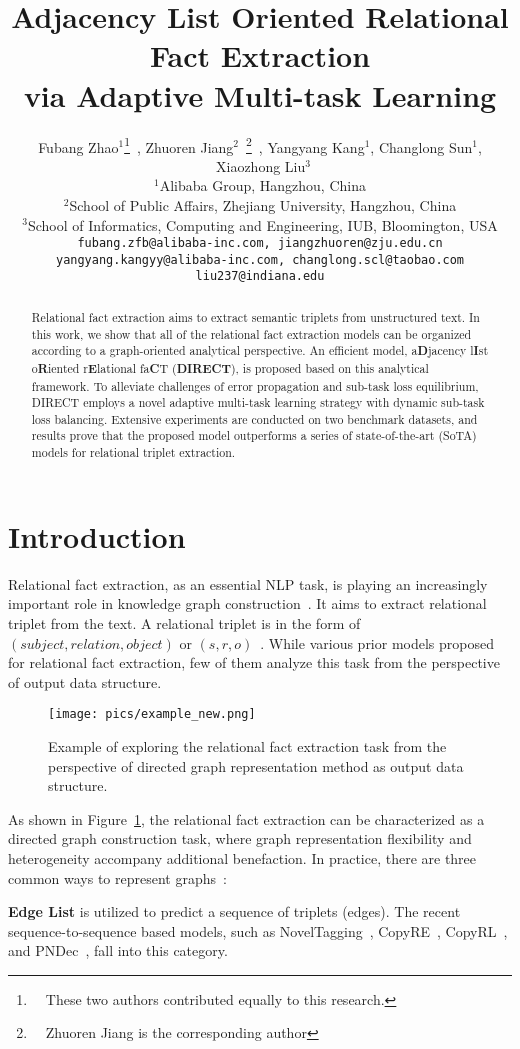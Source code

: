 \documentclass[11pt,a4paper]{article}
\title{Adjacency List Oriented Relational Fact Extraction \\via Adaptive Multi-task Learning}
\author{Fubang Zhao$^1$\thanks{~~These two authors contributed equally to this research.}~, Zhuoren Jiang$^2$\footnotemark[1]~\thanks{~~Zhuoren Jiang is the corresponding author}~, Yangyang Kang$^1$, Changlong Sun$^1$, ~Xiaozhong Liu$^3$  \\
$^1$Alibaba Group, Hangzhou, China\\
$^2$School of Public Affairs, Zhejiang University, Hangzhou, China\\
$^3$School of Informatics, Computing and Engineering, IUB, Bloomington, USA\\
{\tt fubang.zfb@alibaba-inc.com, jiangzhuoren@zju.edu.cn}\\
{\tt yangyang.kangyy@alibaba-inc.com, changlong.scl@taobao.com}\\
{\tt liu237@indiana.edu}}
\date{}
\begin{document}
\maketitle
\begin{abstract}
Relational fact extraction aims to extract semantic triplets from unstructured text. In this work, we show that all of the relational fact extraction models can be organized according to a graph-oriented analytical perspective. An efficient model, a\textbf{D}jacency l\textbf{I}st o\textbf{R}iented r\textbf{E}lational fa\textbf{C}T (\textbf{DIRECT}), is proposed based on this analytical framework. To alleviate challenges of error propagation and sub-task loss equilibrium, DIRECT employs a novel adaptive multi-task learning strategy with dynamic sub-task loss balancing. Extensive experiments are conducted on two benchmark datasets, and results prove that the proposed model outperforms a series of state-of-the-art (SoTA) models for relational triplet extraction.
\end{abstract}

\section{Introduction}\label{sec:intro}
Relational fact extraction, as an essential NLP task, is playing an increasingly important role in knowledge graph construction~\cite{han2019opennre,distiawan2019neural}. It aims to extract relational triplet from the text. A relational triplet is in the form of $(subject, relation, object)$ or $(s, r, o)$~\cite{zeng2019learning}. While various prior models proposed for relational fact extraction, few of them analyze this task from the perspective of output data structure.

\begin{figure}[ht]
\centering
\texttt{[image: pics/example\_new.png]}
\caption{Example of exploring the relational fact extraction task from the perspective of directed graph representation method as output data structure.}
\label{fig:example}
\end{figure}

As shown in Figure~\ref{fig:example}, the relational fact extraction can be characterized as a directed graph construction task, where graph representation flexibility and heterogeneity accompany additional benefaction. In practice, there are three common ways to represent graphs~\cite{gross2005graph}: 

\textbf{Edge List} is utilized to predict a sequence of triplets (edges). The recent sequence-to-sequence based models, such as NovelTagging~\cite{zheng2017joint}, CopyRE~\cite{zeng2018extracting}, CopyRL~\cite{zeng2019learning}, and PNDec~\cite{nayak2020effective}, fall into this category. 
\end{document}
